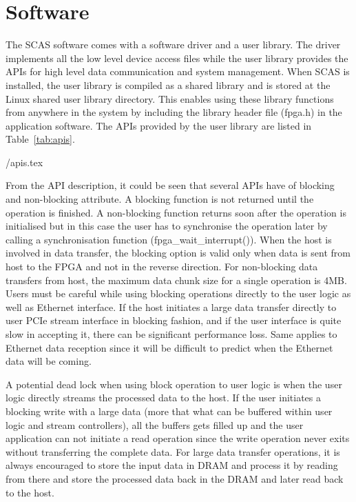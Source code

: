\chapter{Software}
\label{chap_software}

The SCAS software comes with a software driver and a user library.
The driver implements all the low level device access files while the user library provides the APIs for high level data communication and system management.
When SCAS is installed, the user library is compiled as a shared library and is stored at the Linux shared user library directory.
This enables using these library functions from anywhere in the system by including the library header file (fpga.h) in the application software.
The APIs provided by the user library are listed in Table~\ref{tab:apis}.

 \TBLDIR/apis.tex

From the API description, it could be seen that several APIs have of blocking and non-blocking attribute.
A blocking function is not returned until the operation is finished.
A non-blocking function returns soon after the operation is initialised but in this case the user has to synchronise the operation later by calling a synchronisation function (fpga\_wait\_interrupt()).
When the host is involved in data transfer, the blocking option is valid only when data is sent from host to the FPGA and not in the reverse direction.
For non-blocking data transfers from host, the maximum data chunk size for a single operation is 4MB.
Users must be careful while using blocking operations directly to the user logic as well as Ethernet interface.
If the host initiates a large data transfer directly to user PCIe stream interface in blocking fashion, and if the user interface is quite slow in accepting it, there can be significant performance loss.
Same applies to Ethernet data reception since it will be difficult to predict when the Ethernet data will be coming.

A potential dead lock when using block operation to user logic is when the user logic directly streams the processed data to the host.
If the user initiates a blocking write with a large data (more that what can be buffered within user logic and stream controllers), all the buffers gets filled up and the user application can not initiate a read operation since the write operation never exits without transferring the complete data.
For large data transfer operations, it is always encouraged to store the input data in DRAM and process it by reading from there and store the processed data back in the DRAM and later read back to the host.

